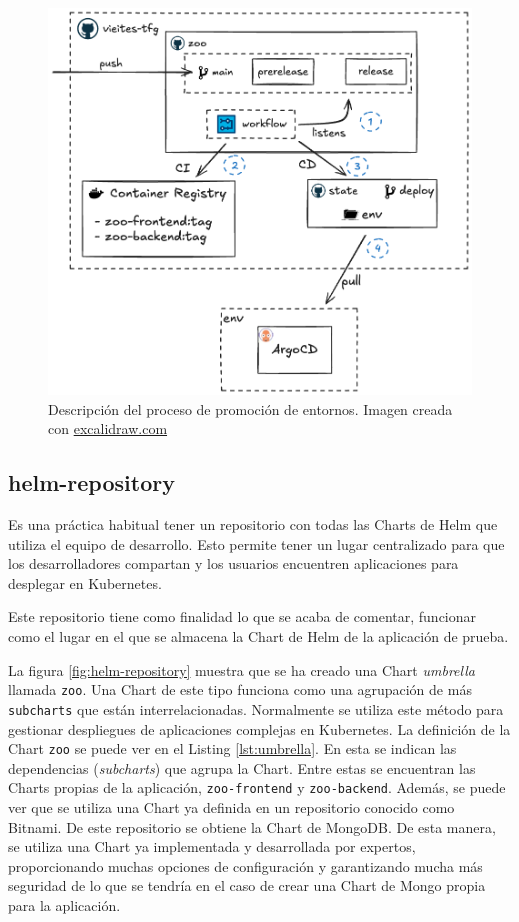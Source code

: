 \begin{figure}[t]
  \centerline{\includegraphics[width=13cm]{figuras/promotion}}
  \caption{Descripción del proceso de promoción de entornos. Imagen creada con \href{https://excalidraw.com}{excalidraw.com}}
  \label{fig:promotion}
\end{figure}

\subsection*{helm-repository}

Es una práctica habitual tener un repositorio con todas las Charts de Helm que utiliza el equipo de desarrollo. Esto permite tener un lugar centralizado para que los desarrolladores compartan y los usuarios encuentren aplicaciones para desplegar en Kubernetes.

Este repositorio tiene como finalidad lo que se acaba de comentar, funcionar como el lugar en el que se almacena la Chart de Helm de la aplicación de prueba.

La figura \ref{fig:helm-repository} muestra que se ha creado una Chart \textit{umbrella} llamada \texttt{zoo}. Una Chart de este tipo funciona como una agrupación de más \texttt{subcharts} que están interrelacionadas. Normalmente se utiliza este método para gestionar despliegues de aplicaciones complejas en Kubernetes.
La definición de la Chart \texttt{zoo} se puede ver en el Listing \ref{lst:umbrella}. En esta se indican las dependencias (\textit{subcharts}) que agrupa la Chart. Entre estas se encuentran las Charts propias de la aplicación, \texttt{zoo-frontend} y \texttt{zoo-backend}. Además, se puede ver que se utiliza una Chart ya definida en un repositorio conocido como Bitnami\cite{bitnami}. De este repositorio se obtiene la Chart de MongoDB. De esta manera, se utiliza una Chart ya implementada y desarrollada por expertos, proporcionando muchas opciones de configuración y garantizando mucha más seguridad de lo que se tendría en el caso de crear una Chart de Mongo propia para la aplicación.


